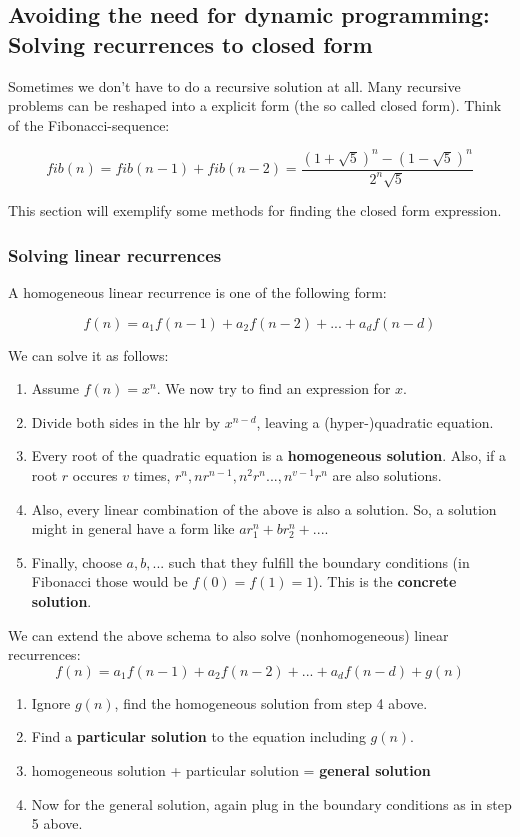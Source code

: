 \subsection{Avoiding the need for dynamic programming: Solving recurrences to closed form}
Sometimes we don't have to do a recursive solution at all. Many recursive problems can be reshaped into a explicit form (the so called closed form). Think of the Fibonacci-sequence: 

$$ fib(n) = fib(n-1) + fib(n-2) = \frac{(1 + \sqrt{5})^n - (1 - \sqrt{5})^n }{2^n \sqrt{5}} $$

This section will exemplify some methods for finding the closed form expression.

\subsubsection{Solving linear recurrences}

A homogeneous linear recurrence is one of the following form: 

$$ f(n) = a_1 f(n-1) + a_2 f(n-2) + ... + a_d f(n-d)$$

We can solve it as follows: 

\begin{enumerate}
    \item Assume $f(n) = x^n$. We now try to find an expression for $x$.
    \item Divide both sides in the hlr by $x^{n-d}$, leaving a (hyper-)quadratic equation. 
    \item Every root of the quadratic equation is a \textbf{homogeneous solution}. Also, if a root $r$ occures $v$ times, $r^n, nr^{n-1}, n^2r^n ..., n^{v-1}r^n$ are also solutions.
    \item Also, every linear combination of the above is also a solution. So, a solution might in general have a form like $a r_1^n + b r_2^n + ...$.
    \item Finally, choose $a, b, ...$ such that they fulfill the boundary conditions (in Fibonacci those would be $f(0) = f(1) = 1$). This is the \textbf{concrete solution}.
\end{enumerate}

We can extend the above schema to also solve (nonhomogeneous) linear recurrences: 
$$ f(n) = a_1 f(n-1) + a_2 f(n-2) + ... + a_d f(n-d) + g(n)$$

\begin{enumerate}
    \item Ignore $g(n)$, find the homogeneous solution from step 4 above.
    \item Find a \textbf{particular solution} to the equation including $g(n)$.
    \item homogeneous solution + particular solution = \textbf{general solution}
    \item Now for the general solution, again plug in the boundary conditions as in step 5 above.
\end{enumerate}


